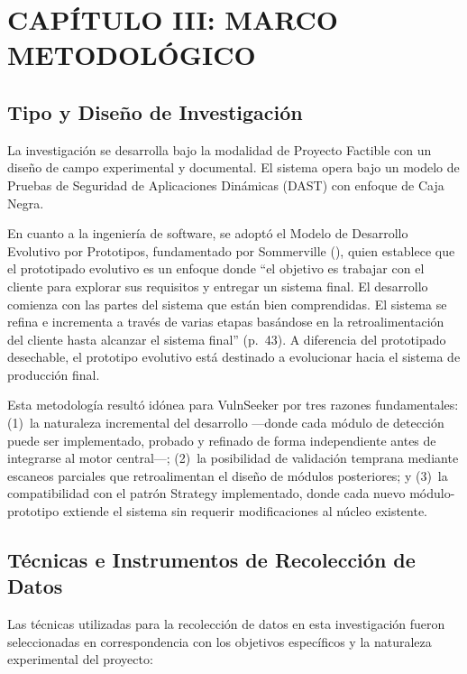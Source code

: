 \documentclass[12pt, a4paper]{article}
\begin{document}
\newpage
\section{CAPÍTULO III: MARCO METODOLÓGICO}

\subsection{Tipo y Diseño de Investigación}

La investigación se desarrolla bajo la modalidad de Proyecto Factible con un
diseño de campo experimental y documental. El sistema opera bajo un modelo de
Pruebas de Seguridad de Aplicaciones Dinámicas (DAST) con enfoque de Caja Negra.

En cuanto a la ingeniería de software, se adoptó el Modelo de Desarrollo
Evolutivo por Prototipos, fundamentado por Sommerville (\citeyear*{sommerville2011}),
quien establece que el prototipado evolutivo es un enfoque donde ``el objetivo es
trabajar con el cliente para explorar sus requisitos y entregar un sistema final.
El desarrollo comienza con las partes del sistema que están bien comprendidas. El
sistema se refina e incrementa a través de varias etapas basándose en la
retroalimentación del cliente hasta alcanzar el sistema final'' (p.~43). A
diferencia del prototipado desechable, el prototipo evolutivo está destinado a
evolucionar hacia el sistema de producción final.

Esta metodología resultó idónea para VulnSeeker por tres razones fundamentales:
(1)~la naturaleza incremental del desarrollo ---donde cada módulo de detección
puede ser implementado, probado y refinado de forma independiente antes de
integrarse al motor central---; (2)~la posibilidad de validación temprana
mediante escaneos parciales que retroalimentan el diseño de módulos posteriores;
y (3)~la compatibilidad con el patrón Strategy implementado, donde cada nuevo
módulo-prototipo extiende el sistema sin requerir modificaciones al núcleo
existente.

\subsection{Técnicas e Instrumentos de Recolección de Datos}

Las técnicas utilizadas para la recolección de datos en esta investigación
fueron seleccionadas en correspondencia con los objetivos específicos y la
naturaleza experimental del proyecto:
\end{document}
